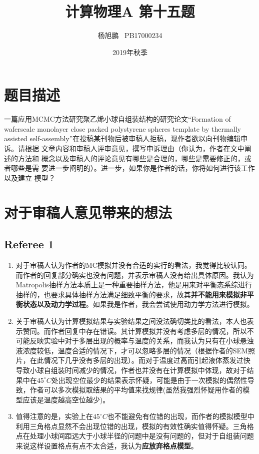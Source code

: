 \documentclass[a4paper,11pt]{article}
\author{ 杨旭鹏  \  PB17000234}
\date{2019年秋季}
\title{计算物理A 第十五题}
\begin{document}
\maketitle

\section{题目描述}
一篇应用MCMC方法研究聚乙烯小球自组装结构的研究论文“Formation of waferscale monolayer close packed polystyrene spheres template by thermally assisted self-assembly”在投稿某刊物后被审稿人拒稿，现作者欲以向刊物编辑申诉。请根据 文章内容和审稿人评审意见，撰写申诉理由（你认为，作者在文中阐述的方法和 概念以及审稿人的评论意见有哪些是合理的，哪些是需要修正的，或者哪些是需 要进一步阐明的）。进一步，如果你是作者的话，你将如何进行该工作以及建立 模型？

\section{对于审稿人意见带来的想法}

\subsection{Referee 1}
\begin{enumerate}
\item  
对于审稿人认为作者的MC模拟并没有合适的实行的看法，我觉得比较认同。而作者的回复部分确实也没有问题，并表示审稿人没有给出具体原因。我认为Matropolis抽样方法本质上是一种重要抽样方法，他是用来对平衡态系综进行抽样的，也要求具体抽样方法满足细致平衡的要求，故其\textbf{并不能用来模拟非平衡状态以及动力学过程}。如果我是作者，我会尝试使用动力学方法进行模拟。

\item 
关于审稿人认为计算模拟结果与实验结果之间没法确切类比的看法，本人也表示赞同。而作者回复中存在错误。其计算模拟并没有考虑多层的情况，所以不可能反映实验中对于多层出现的概率与温度的关系，而我认为只有在小球悬浊液浓度较低，温度合适的情况下，才可以忽略多层的情况（根据作者的SEM照片，在此情况下几乎没有多层的出现）。而对于温度过高而引起液体蒸发过快导致小球自组装时间减少的情况，作者也并没有在计算模拟中体现，故对于结果中在$45 ^\circ C$处出现空位最少的结果表示怀疑，可能是由于一次模拟的偶然性导致，作者可以多次模拟取结果的平均值来找规律(虽然我强烈怀疑用作者的模型应该是温度越高空位越少)。

\item
值得注意的是，实验上在$45 ^\circ C$也不能避免有位错的出现，而作者的模拟模型中利用三角格点显然不会出现位错的出现，模拟的有效性确实值得怀疑。三角格点在处理小球间距远大于小球半径的问题中是没有问题的，但对于自组装问题来说这样设置格点有点不太合适，我认为\textbf{应放弃格点模型}。

\end{enumerate}
\end{document}
